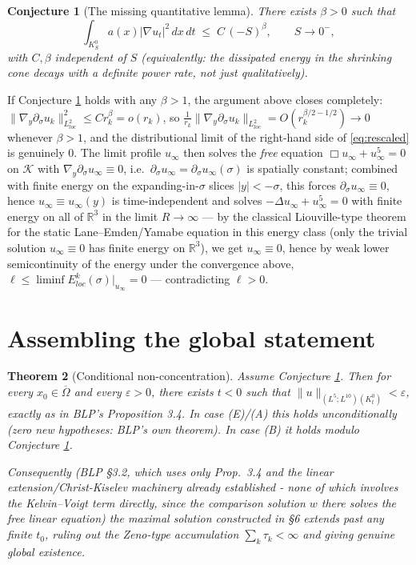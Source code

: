 \documentclass[11pt,letterpaper]{amsart}
\newtheorem{theorem}{Theorem}[section]
\newcommand{\Om}{\Omega}
\newtheorem{conjecture}[theorem]{Conjecture}
\begin{document}
\begin{conjecture}[The missing quantitative lemma]\label{conj:rate}
There exists $\beta>0$ such that
\[
\int_{K_S^0} a(x)|\nabla u_t|^2\,dx\,dt \;\le\; C\,(-S)^{\beta}, \qquad S\to0^-,
\]
with $C,\beta$ independent of $S$ (equivalently: the dissipated energy in the shrinking cone decays with a definite power rate, not just qualitatively).
\end{conjecture}

If Conjecture \ref{conj:rate} holds with any $\beta>1$, the argument above closes completely: $\|\nabla_y\partial_\sigma u_k\|^2_{L^2_{loc}} \le C r_k^\beta = o(r_k)$, so $\frac1{r_k}\|\nabla_y\partial_\sigma u_k\|_{L^2_{loc}} = O(r_k^{\beta/2-1/2}) \to 0$ whenever $\beta>1$, and the distributional limit of the right-hand side of \eqref{eq:rescaled} is genuinely $0$. The limit profile $u_\infty$ then solves the \emph{free} equation $\Box u_\infty + u_\infty^5=0$ on $\mathcal K$ with $\nabla_y\partial_\sigma u_\infty\equiv0$, i.e.\ $\partial_\sigma u_\infty=\partial_\sigma u_\infty(\sigma)$ is spatially constant; combined with finite energy on the expanding-in-$\sigma$ slices $|y|<-\sigma$, this forces $\partial_\sigma u_\infty\equiv0$, hence $u_\infty\equiv u_\infty(y)$ is time-independent and solves $-\Delta u_\infty + u_\infty^5=0$ with finite energy on all of $\mathbb R^3$ in the limit $R\to\infty$ --- by the classical Liouville-type theorem for the static Lane--Emden/Yamabe equation in this energy class (only the trivial solution $u_\infty\equiv0$ has finite energy on $\mathbb R^3$), we get $u_\infty\equiv0$, hence by weak lower semicontinuity of the energy under the convergence above, $\ell \le \liminf E_{loc}^k(\sigma) \big|_{u_\infty} = 0$ --- contradicting $\ell>0$.


\section{Assembling the global statement}

\begin{theorem}[Conditional non-concentration]
Assume Conjecture \ref{conj:rate}. Then for every $x_0\in\overline\Om$ and every $\varepsilon>0$, there exists $t<0$ such that $\|u\|_{(L^5;L^{10})(K_t^0)}<\varepsilon$, exactly as in BLP's \cite{BurqLebeauPlanchon} Proposition 3.4. In case (E)/(A) this holds unconditionally (zero new hypotheses: BLP's own theorem). In case (B) it holds modulo Conjecture \ref{conj:rate}.

Consequently (BLP \cite{BurqLebeauPlanchon} \S3.2, which uses only Prop.\ 3.4 and the linear extension/Christ-Kiselev machinery already established - none of which involves the Kelvin--Voigt term directly, since the comparison solution $w$ there solves the \emph{free} linear equation) the maximal solution constructed in \S6 extends past any finite $t_0$, ruling out the Zeno-type accumulation $\sum_k\tau_k<\infty$ and giving genuine global existence.
\end{theorem}
\end{document}
